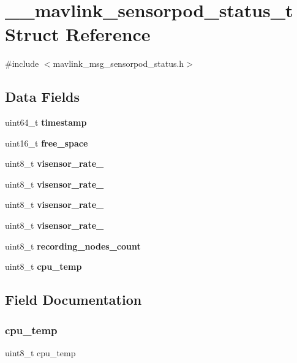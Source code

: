 \section{\+\_\+\+\_\+mavlink\+\_\+sensorpod\+\_\+status\+\_\+t Struct Reference}
\label{struct____mavlink__sensorpod__status__t}


{\ttfamily \#include $<$mavlink\+\_\+msg\+\_\+sensorpod\+\_\+status.\+h$>$}

\subsection*{Data Fields}
\begin{DoxyCompactItemize}
\item 
uint64\+\_\+t \textbf{ timestamp}
\item 
uint16\+\_\+t \textbf{ free\+\_\+space}
\item 
uint8\+\_\+t \textbf{ visensor\+\_\+rate\+\_}
\item 
uint8\+\_\+t \textbf{ visensor\+\_\+rate\+\_}
\item 
uint8\+\_\+t \textbf{ visensor\+\_\+rate\+\_}
\item 
uint8\+\_\+t \textbf{ visensor\+\_\+rate\+\_}
\item 
uint8\+\_\+t \textbf{ recording\+\_\+nodes\+\_\+count}
\item 
uint8\+\_\+t \textbf{ cpu\+\_\+temp}
\end{DoxyCompactItemize}


\subsection{Field Documentation}
\mbox{\label{struct____mavlink__sensorpod__status__t_a04082e03cbdc955102fd368c39e769f0}} 
\subsubsection{cpu\+\_\+temp}
{\footnotesize\ttfamily uint8\+\_\+t cpu\+\_\+temp}

\mbox{\label{struct____mavlink__sensorpod__status__t_ab4ebc9c47a0af73a347b28ceaf75c6e0}} 

